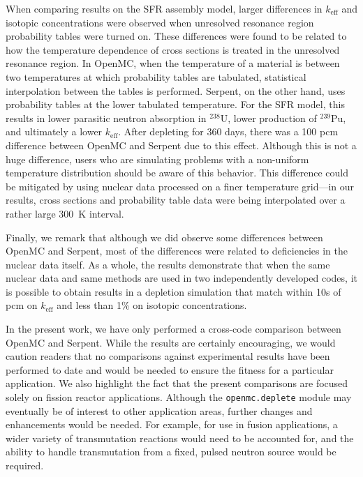 \documentclass[3p,authoryear]{elsarticle}
\begin{document}
When comparing results on the SFR assembly model, larger differences in
$k_\text{eff}$ and isotopic concentrations were observed when unresolved
resonance region probability tables were turned on. These differences were found
to be related to how the temperature dependence of cross sections is treated in
the unresolved resonance region. In OpenMC, when the temperature of a material
is between two temperatures at which probability tables are tabulated,
statistical interpolation between the tables is performed. Serpent, on the other
hand, uses probability tables at the lower tabulated temperature. For the SFR
model, this results in lower parasitic neutron absorption in $^{238}$U, lower
production of $^{239}$Pu, and ultimately a lower $k_\text{eff}$. After depleting
for 360 days, there was a 100 pcm difference between OpenMC and Serpent due to
this effect. Although this is not a huge difference, users who are simulating
problems with a non-uniform temperature distribution should be aware of this
behavior. This difference could be mitigated by using nuclear data processed on
a finer temperature grid---in our results, cross sections and probability table
data were being interpolated over a rather large \SI{300}{\kelvin} interval.

Finally, we remark that although we did observe some differences between OpenMC
and Serpent, most of the differences were related to deficiencies in the nuclear
data itself. As a whole, the results demonstrate that when the same nuclear data
and same methods are used in two independently developed codes, it is possible
to obtain results in a depletion simulation that match within 10s of pcm on
$k_\text{eff}$ and less than 1\% on isotopic concentrations.

In the present work, we have only performed a cross-code comparison between
OpenMC and Serpent. While the results are certainly encouraging, we would
caution readers that no comparisons against experimental results have been
performed to date and would be needed to ensure the fitness for a particular
application. We also highlight the fact that the present comparisons are focused
solely on fission reactor applications. Although the \texttt{openmc.deplete}
module may eventually be of interest to other application areas, further changes
and enhancements would be needed. For example, for use in fusion applications, a
wider variety of transmutation reactions would need to be accounted for, and the
ability to handle transmutation from a fixed, pulsed neutron source would be
required.
\end{document}
